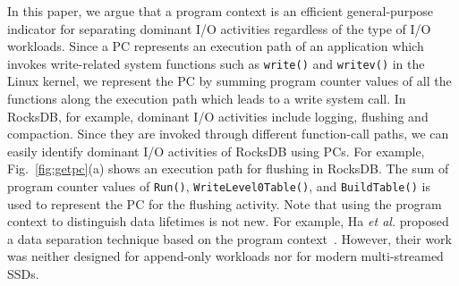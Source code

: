 In this paper, we argue that a program context is an efficient  general-purpose
indicator for separating dominant I/O activities regardless of the type of I/O
workloads.  Since a PC represents an execution path of an application which
invokes write-related system functions such as {\tt write()} and {\tt writev()}
in the Linux kernel,  we represent the PC by summing program counter values of
all the functions along the execution path which leads to a write system call.
In RocksDB, for example, dominant I/O activities include logging, flushing and
compaction.  Since they are invoked through different function-call paths, we
can easily identify dominant I/O activities of RocksDB using PCs.  For example,
Fig.~\ref{fig:getpc}(a) shows an execution path for flushing in RocksDB.  The
sum of program counter values of \texttt{Run()}, \texttt{WriteLevel0Table()},
and \texttt{BuildTable()} is used to represent the PC for the flushing
activity.  Note that using the program context to distinguish data lifetimes is
not new.  For example, Ha {\it et al.} proposed a data separation technique
based on the program context~\cite{PCHa}.   However, their work was neither
designed for append-only workloads nor for modern multi-streamed SSDs.

